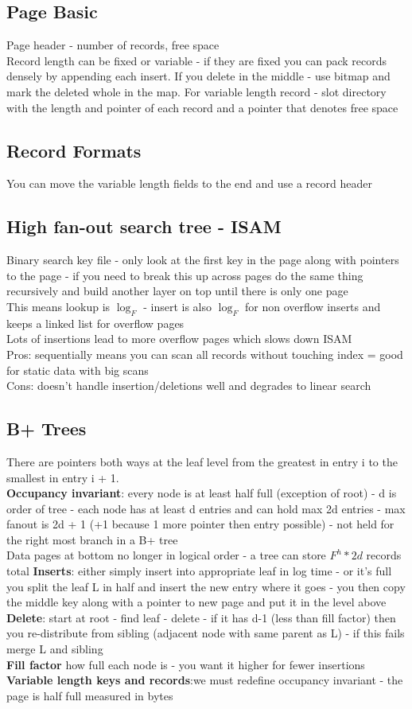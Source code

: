 \documentclass{article}
\begin{document}
\subsection{Page Basic}
Page header - number of records, free space \\
Record length can be fixed or variable - if they are fixed you can pack records densely by appending each insert. If you delete in the middle - use bitmap and mark the deleted whole in the map. For variable length record - slot directory with the length and pointer of each record and a pointer that denotes free space
\subsection{Record Formats}
You can move the variable length fields to the end and use a record header
\subsection{High fan-out search tree - ISAM}
Binary search key file - only look at the first key in the page along with pointers to the page - if you need to break this up across pages do the same thing recursively and build another layer on top until there is only one page \\ 
This means lookup is $\log_F$ - insert is also $\log_F$ for non overflow inserts and keeps a linked list for overflow pages \\
Lots of insertions lead to more overflow pages which slows down ISAM \\ 
Pros: sequentially means you can scan all records without touching index = good for static data with big scans \\
Cons: doesn't handle insertion/deletions well and degrades to linear search
\subsection{B+ Trees}
There are pointers both ways at the leaf level from the greatest in entry i to the smallest in entry i + 1. \\
\textbf{Occupancy invariant}: every node is at least half full (exception of root) - d is order of tree - each node has at least d entries and can hold max 2d entries - max fanout is 2d + 1 (+1 because 1 more pointer then entry possible) - not held for the right most branch in a B+ tree \\
Data pages at bottom no longer in logical order - a tree can store $F^h * 2d$ records total
\textbf{Inserts}: either simply insert into appropriate leaf in log time - or it's full you split the leaf L in half and insert the new entry where it goes - you then copy the middle key along with a pointer to new page and put it in the level above \\
\textbf{Delete}: start at root - find leaf - delete - if it has d-1 (less than fill factor) then you re-distribute from sibling (adjacent node with same parent as L) - if this fails merge L and sibling \\
\textbf{Fill factor} how full each node is - you want it higher for fewer insertions \\
\textbf{Variable length keys and records}:we must redefine occupancy invariant - the page is half full measured in bytes
\end{document}
